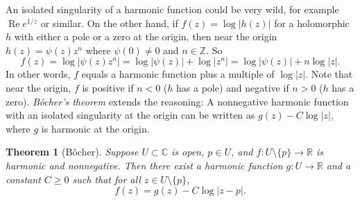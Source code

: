 \documentclass[12pt,openany]{book}
\renewcommand{\Re}{\operatorname{Re}}
\newcommand{\sabs}[1]{\lvert {#1} \rvert}
\newcommand{\abs}[1]{\left\lvert {#1} \right\rvert}
\newcommand{\C}{{\mathbb{C}}}
\newcommand{\R}{{\mathbb{R}}}
\newcommand{\Z}{{\mathbb{Z}}}
\theoremstyle{plain}
\newtheorem{thm}{Theorem}[section]
\theoremstyle{remark}
\theoremstyle{definition}
\theoremstyle{exercise}
\theoremstyle{example}
\begin{document}
An isolated singularity of a harmonic function could be very wild, for
example $\Re e^{1/z}$ or similar.  On the other hand, if $f(z) = \log \sabs{h(z)}$
for a holomorphic $h$ with either a pole or a zero at the origin,
then near the origin $h(z) = \psi(z) z^n$ where $\psi(0)\not=0$ and $n \in \Z$.
So
\begin{equation*}
f(z) =
\log \sabs{\psi(z) z^n} = 
\log \sabs{\psi(z)} + \log \abs{z^n} = 
\log \sabs{\psi(z)} +
n \log \sabs{z} .
\end{equation*}
In other words, $f$ equals a harmonic function plus a multiple of $\log \sabs{z}$.
Note that near the origin,
$f$ is positive if $n < 0$ ($h$ has a pole) and
negative if $n > 0$ ($h$ has a zero).
\emph{B\^{o}cher's theorem}
extends the reasoning:
A nonnegative harmonic function with an isolated singularity
at the origin can be written as
$g(z) - C \log \sabs{z}$, where $g$ is
harmonic at the origin.

\begin{thm}[B\^{o}cher]
Suppose $U \subset \C$ is open, $p \in U$, and
$f \colon U \setminus \{ p \} \to \R$ is
harmonic and nonnegative.  Then there exist a harmonic function
$g \colon U \to \R$ and a constant $C \geq 0$ such that
for all $z \in U \setminus \{ p \}$,
\begin{equation*}
f(z) = g(z) - C \log \sabs{z-p} .
\end{equation*}
\end{thm}
\end{document}
